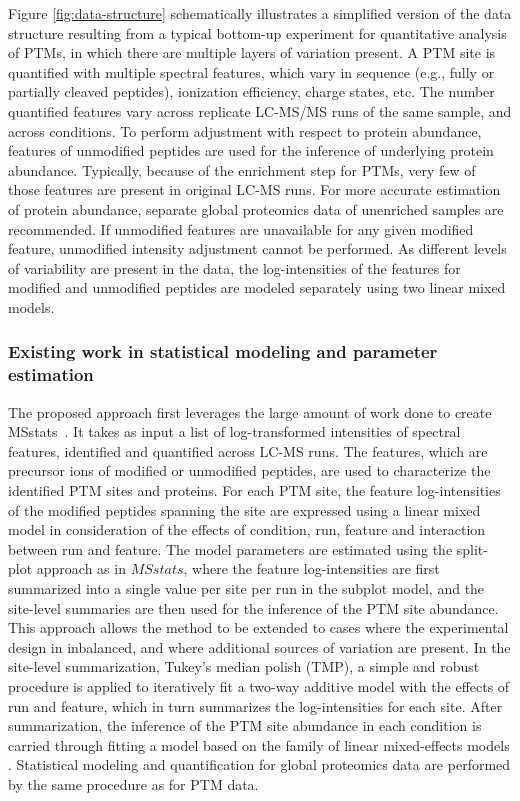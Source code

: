 \documentclass[mcp]{article}
\numberwithin{figure}{section} %
\numberwithin{table}{section}
\begin{document}
Figure \ref{fig:data-structure} schematically illustrates a simplified version of the data structure resulting from a typical bottom-up experiment for quantitative analysis of PTMs, in which there are multiple layers of variation present. A PTM site is quantified with multiple spectral features, which vary in sequence (e.g., fully or partially cleaved peptides), ionization efficiency, charge states, etc. The number quantified features vary across replicate LC-MS/MS runs of the same sample, and across conditions. To perform adjustment with respect to protein abundance, features of unmodified peptides are used for the inference of underlying protein abundance. Typically, because of the enrichment step for PTMs, very few of those features are present in original LC-MS runs. For more accurate estimation of protein abundance, separate global proteomics data of unenriched samples are recommended. If unmodified features are unavailable for any given modified feature, unmodified intensity adjustment cannot be performed. As different levels of variability are present in the data, the log-intensities of the features for modified and unmodified peptides are modeled separately using two linear mixed models.

\subsubsection*{Existing work in statistical modeling and parameter estimation}

The proposed approach first leverages the large amount of work done to create MSstats~\cite{Choi:2014}. It takes as input a list of log-transformed intensities of spectral features, identified and quantified across LC-MS runs. The features, which are precursor ions of modified or unmodified peptides, are used to characterize the identified PTM sites and proteins. For each PTM site, the feature log-intensities of the modified peptides spanning the site are expressed using a linear mixed model in consideration of the effects of condition, run, feature and interaction between run and feature. The model parameters are estimated using the split-plot approach as in $MSstats$, where the feature log-intensities are first summarized into a single value per site per run in the subplot model, and the site-level summaries are then used for the inference of the PTM site abundance\cite{Choi:2014}. This approach allows the method to be extended to cases where the experimental design in inbalanced, and where additional sources of variation are present. In the site-level summarization, Tukey's median polish (TMP), a simple and robust procedure is applied to iteratively fit a two-way additive model with the effects of run and feature, which in turn summarizes the log-intensities for each site\cite{Tukey:1977}. After summarization, the inference of the PTM site abundance in each condition is carried through fitting a model based on the family of linear mixed-effects models\cite{Bolker2009} \cite{Faraway:2006}. Statistical modeling and quantification for global proteomics data are performed by the same procedure as for PTM data.
\end{document}
